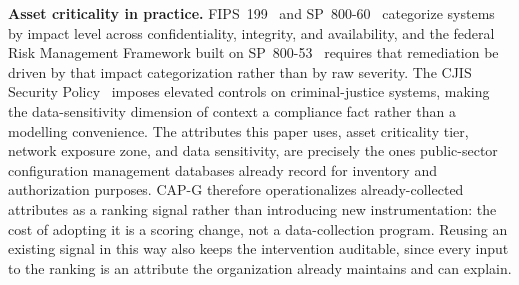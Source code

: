 \textbf{Asset criticality in practice.} FIPS~199~\cite{fips199} and SP~800-60~\cite{nist80060}
categorize systems by impact level across confidentiality, integrity, and availability, and the
federal Risk Management Framework built on SP~800-53~\cite{nist80053} requires that remediation
be driven by that impact categorization rather than by raw severity. The CJIS Security
Policy~\cite{cjis2023} imposes elevated controls on criminal-justice systems, making the
data-sensitivity dimension of context a compliance fact rather than a modelling convenience. The
attributes this paper uses, asset criticality tier, network exposure zone, and data sensitivity,
are precisely the ones public-sector configuration management databases already record for inventory
and authorization purposes. CAP-G therefore operationalizes already-collected attributes as a
ranking signal rather than introducing new instrumentation: the cost of adopting it is a scoring
change, not a data-collection program. Reusing an existing signal in this way also keeps the
intervention auditable, since every input to the ranking is an attribute the organization already
maintains and can explain.
